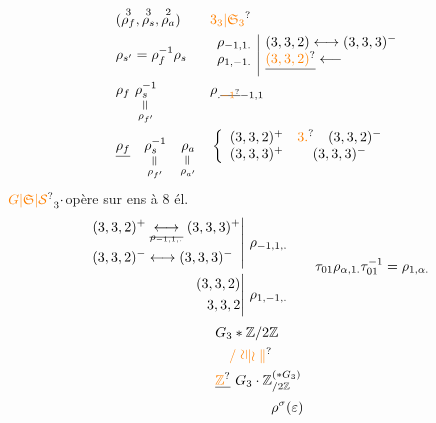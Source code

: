 \[
\begin{aligned}
 &(\overset{3}{\rho_f},\overset{3}{\rho_s},\overset{2}{\rho_a}) &&\unsure{3_3|\mathfrak S_3}\\
 &\rho_{s'}=\rho_f^{-1}\rho_s &&
 \begin{array}{l|l}
 \rho_{-1,1.}&(3,3,2)\longleftrightarrow(3,3,3)^-\\
 \rho_{1,-1.}&\deleted{\unsure{(3,3,2)}}\longleftarrow
 \end{array}\\
 &\rho_f\ \underset{\substack{\rotatebox{90}{$=$}\\\rho_{f'}}}{\rho_s^{-1}}
 &&\rho_{.\deleted{\unsure{-1}}-1,1}\\
 &\deleted{\rho_f}\quad\underset{\substack{\rotatebox{90}{$=$}\\\rho_{f'}}}{\rho_s^{-1}}\quad
 \underset{\substack{\rotatebox{90}{$=$}\\\rho_{a'}}}{\rho_a}
 &&\left\{\begin{array}{cc}(3,3,2)^+&\unsure{3.}\quad(3,3,2)^-\\
 (3,3,3)^+&(3,3,3)^-\end{array}\right.
\end{aligned}
\]
${\unsure{G|\mathfrak S|\mathcal S}}_3\cdot$\qquad opère sur  ens à $8$ él.
\[
\begin{aligned}
\left.\begin{aligned}
 (3,3,2)^+ &\underset{\deleted{\rho_{-1,1,.}}}{\longleftrightarrow}(3,3,3)^+\\
 (3,3,2)^- &\longleftrightarrow(3,3,3)^-
\end{aligned}\right|&\ \rho_{-1,1,.}\\
\left.\begin{aligned}
 (3,3,2)\\ 3,3,2
\end{aligned}\right|&\ \rho_{1,-1,.}
\end{aligned}
\qquad
\tau_{01}\rho_{\alpha,1.}\tau_{01}^{-1}=\rho_{1,\alpha.}
\]
\[
\begin{aligned}
 &G_3*\mathbb Z/2\mathbb Z\\
 &\quad\unsure{\mathord{/}\ \rotatebox{90}{$\simeq$}|\wr\mathrel{\Vert}}\\
 &\deleted{\unsure{\mathbb Z}}\ G_3\cdot{\mathbb Z}_{/2\mathbb Z}^{(*G_3)}\\
 &\qquad\qquad\rho^\sigma(\varepsilon)
\end{aligned}
\]
